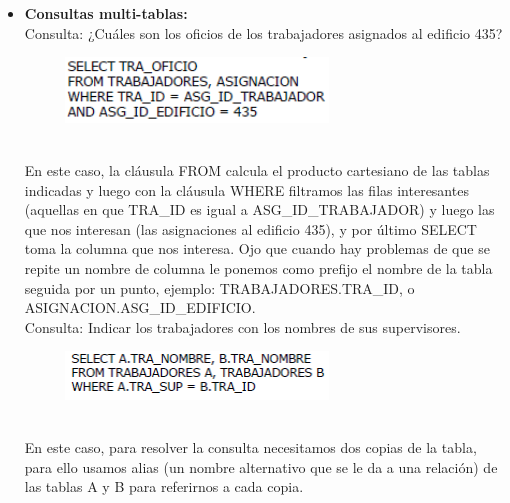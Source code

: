 \documentclass[preprint,12pt]{elsarticle}
\begin{document}
\begin{itemize}
\item \textbf{Consultas multi-tablas:} \\ Consulta: ¿Cuáles son los oficios de los trabajadores asignados al edificio 435?
	\begin{figure}[htb]
		\begin{center}
			\includegraphics[width=7cm]{./IMAGENES/consultamultip1}
		\end{center}
	\end{figure}
\\En este caso, la cláusula FROM calcula el producto cartesiano de las tablas indicadas y luego con la cláusula WHERE filtramos las filas interesantes (aquellas en que TRA\_ID es igual a ASG\_ID\_TRABAJADOR) y luego las que nos interesan (las asignaciones al edificio 435), y por último SELECT toma la columna que nos interesa. Ojo que cuando hay problemas de que se repite un nombre de columna le ponemos como prefijo el nombre de la tabla seguida por un punto, ejemplo: TRABAJADORES.TRA\_ID, o ASIGNACION.ASG\_ID\_EDIFICIO. \\ Consulta: Indicar los trabajadores con los nombres de sus supervisores.
	\begin{figure}[htb]
		\begin{center}
			\includegraphics[width=7cm]{./IMAGENES/consultamultip2}
		\end{center}
	\end{figure}
\\En este caso, para resolver la consulta necesitamos dos copias de la tabla, para ello usamos alias (un nombre alternativo que se le da a una relación) de las tablas A y B para referirnos a cada copia.


\end{itemize}
\end{document}

